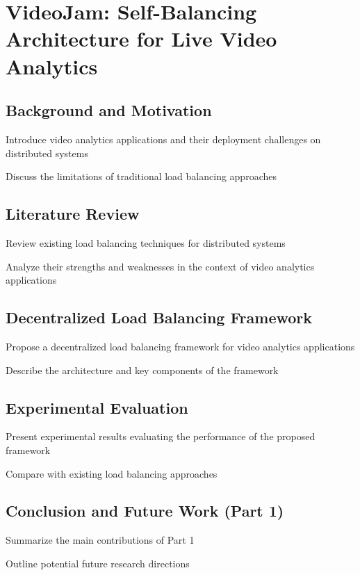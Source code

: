 \setchapterpreamble[u]{\margintoc}
\chapter{VideoJam: Self-Balancing Architecture for Live Video Analytics}

\section{Background and Motivation}

Introduce video analytics applications and their deployment challenges on distributed systems 

Discuss the limitations of traditional load balancing approaches 

\section{Literature Review}

Review existing load balancing techniques for distributed systems 

Analyze their strengths and weaknesses in the context of video analytics applications 

\section{Decentralized Load Balancing Framework}

Propose a decentralized load balancing framework for video analytics applications 

Describe the architecture and key components of the framework 

\section{Experimental Evaluation}

Present experimental results evaluating the performance of the proposed framework 

Compare with existing load balancing approaches 

\section{Conclusion and Future Work (Part 1)}

Summarize the main contributions of Part 1 

Outline potential future research directions 